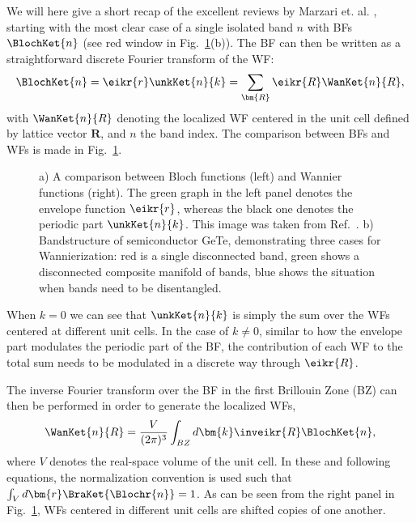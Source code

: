 We will here give a short recap of the excellent reviews by Marzari et. al. \cite{Marzari2003,Marzari2012}, starting with the most clear case of a single isolated band $n$ with BFs $\BlochKet{n}$ (see red window in Fig.~\ref{fig:Theory_blochvswan}(b)).
The BF can then be written as a straightforward discrete Fourier transform of the WF: 
\begin{equation}
	\label{eq:Theory_1bandwan}
	\BlochKet{n} = \eikr{r} \unkKet{n}{k} = \sum_{\bm{R}} \eikr{R} \WanKet{n}{R},
\end{equation}
with $\WanKet{n}{R}$ denoting the localized WF centered in the unit cell defined by lattice vector $\bm{R}$, and $n$ the band index.
The comparison between BFs and WFs is made in Fig.~\ref{fig:Theory_blochvswan}.
\begin{figure}
	\caption{\label{fig:Theory_blochvswan} a) A comparison between Bloch functions (left) and Wannier functions (right). The green graph in the left panel denotes the envelope function $\eikr{r}$, whereas the black one denotes the periodic part $\unkKet{n}{k}$. This image was taken from Ref.~\cite{Marzari2012}. b) Bandstructure of semiconductor GeTe, demonstrating three cases for Wannierization: red is a single disconnected band, green shows a disconnected composite manifold of bands, blue shows the situation when bands need to be disentangled.}
\end{figure}
When $k=0$ we can see that $\unkKet{n}{k}$ is simply the sum over the WFs centered at different unit cells.
In the case of $k \neq 0$, similar to how the envelope part modulates the periodic part of the BF, the contribution of each WF to the total sum needs to be modulated in a discrete way through $\eikr{R}$.

The inverse Fourier transform over the BF in the first Brillouin Zone (BZ) can then be performed in order to generate the localized WFs,
\begin{equation}
	\label{eq:Theory_wanfourier}
	\WanKet{n}{R} = \frac{V}{(2\pi)^3} \int_{BZ} d \bm{k} \inveikr{R} \BlochKet{n},
\end{equation}
where $V$ denotes the real-space volume of the unit cell.
In these and following equations, the normalization convention is used such that $\int_V d\bm{r}\BraKet{\Blochr{n}} = 1$.
As can be seen from the right panel in Fig.~\ref{fig:Theory_blochvswan}, WFs centered in different unit cells are shifted copies of one another.

